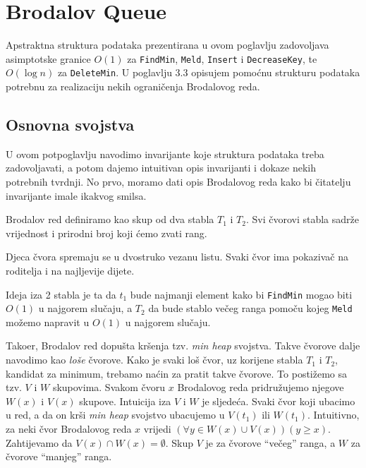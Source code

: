 \newenvironment{myindentpar}[1]%
 {\begin{list}{}%
         {\setlength{\leftmargin}{#1}}%
         \item[]%
 }
 {\end{list}}

\chapter{Brodalov Queue}

Apstraktna struktura podataka prezentirana u ovom poglavlju zadovoljava asimptotske granice $O(1)$ za \texttt{FindMin}, \texttt{Meld}, \texttt{Insert} i \texttt{DecreaseKey}, te $O(\log n)$ za \texttt{DeleteMin}.
U poglavlju 3.3 opisujem pomo\'{c}nu strukturu podataka potrebnu za realizaciju nekih ograni\v{c}enja Brodalovog reda.

\section{Osnovna svojstva}

U ovom potpoglavlju navodimo invarijante koje struktura podataka treba zadovoljavati, a potom dajemo intuitivan opis invarijanti i dokaze nekih potrebnih tvrdnji.
No prvo, moramo dati opis Brodalovog reda kako bi \v{c}itatelju invarijante imale ikakvog smilsa.

Brodalov red definiramo kao skup od dva stabla $T_{1}$ i $T_{2}$.
Svi \v{c}vorovi stabla sadr\v{z}e vrijednost i prirodni broj koji \'{c}emo zvati rang.

Djeca \v{c}vora spremaju se u dvostruko vezanu listu.
Svaki \v{c}vor ima pokaziva\v{c} na roditelja i na najljevije dijete.

Ideja iza 2 stabla je ta da $t_{1}$ bude najmanji element kako bi \texttt{FindMin} mogao biti $O(1)$ u najgorem slu\v{c}aju, a $T_{2}$ da bude stablo ve\v{c}eg ranga pomo\v{c}u kojeg \texttt{Meld} mo\v{z}emo napravit u $O(1)$ u najgorem slu\v{c}aju.

Tako\dj er, Brodalov red dopu\v{s}ta kr\v{s}enja tzv. \emph{min heap} svojstva.
Takve \v{c}vorove dalje navodimo kao \emph{lo\v{s}e} \v{c}vorove.
Kako je svaki lo\v{s} \v{c}vor, uz korijene stabla $T_{1}$ i $T_{2}$, kandidat za minimum, trebamo na\'{c}in za pratit takve \v{c}vorove.
To posti\v{z}emo sa tzv. $V$ i $W$ skupovima.
Svakom \v{c}voru $x$ Brodalovog reda pridru\v{z}ujemo njegove $W(x)$ i $V(x)$ skupove.
Intuicija iza $V$ i $W$ je sljede\'{c}a.
Svaki \v{c}vor koji ubacimo u red, a da on kr\v{s}i \emph{min heap} svojstvo ubacujemo u $V(t_{1})$ ili $W(t_{1})$.
Intuitivno, za neki \v{c}vor Brodalovog reda $x$ vrijedi $(\forall y \in W(x) \cup V(x))(y \ge x)$.
Zahtijevamo da $V(x) \cap W(x) = \emptyset$.
Skup $V$ je za \v{c}vorove ``ve\v{c}eg'' ranga, a $W$ za \v{c}vorove ``manjeg'' ranga.

